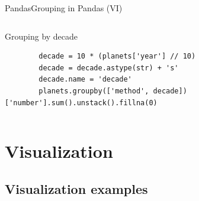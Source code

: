 \documentclass[10pt,compress]{beamer} %
\begin{document}
\begin{frame}[fragile]{Pandas}{Grouping in Pandas (VI)}
	\begin{columns}
	\begin{exampleblock}{Grouping by decade}
	\vspace{-0.2cm} 
		\begin{lstlisting}
		decade = 10 * (planets['year'] // 10)
		decade = decade.astype(str) + 's'
		decade.name = 'decade'
		planets.groupby(['method', decade])['number'].sum().unstack().fillna(0)
		\end{lstlisting}
		\vspace{-0.2cm} 
	\end{exampleblock}
	\end{columns}
\end{frame}

\section{Visualization}
\subsection{Visualization examples}
\end{document}
